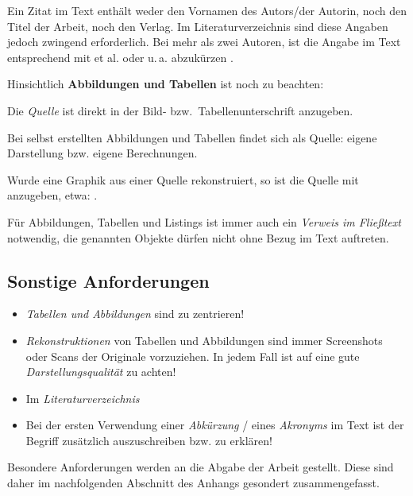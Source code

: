 \begin{compactitem}[\quad$\star$]
\begin{compactitem}[\quad\checkmark]
  \item Ein Zitat im Text enthält weder den Vornamen des Autors/der Autorin, noch den Titel der Arbeit, noch den Verlag.
    Im Literaturverzeichnis sind diese Angaben jedoch zwingend erforderlich. Bei mehr als zwei Autoren, ist die Angabe 
    im Text entsprechend mit \glqq et al.\grqq{} oder \glqq u.\,a.\grqq{} abzukürzen \parencite[vgl~][]{Chapman1999}.
  \end{compactitem}
\item Hinsichtlich \textbf{Abbildungen und Tabellen} ist noch zu beachten:
  \begin{compactitem}[\quad\checkmark]
  \item Die \emph{Quelle} ist direkt in der Bild- bzw.~Tabellenunterschrift anzugeben.
    \begin{compactitem}[\quad--]
    \item Bei selbst erstellten Abbildungen und Tabellen findet sich als Quelle: \glqq eigene Darstellung\grqq{} bzw. 
      \glqq eigene Berechnungen\grqq.
    \item Wurde eine Graphik aus einer Quelle rekonstruiert, so ist die Quelle mit anzugeben, etwa: 
      \glqq\parencite[eigene Darstellung nach][]{Mayring1994}\grqq.
    \end{compactitem}
  \item Für Abbildungen, Tabellen und Listings ist immer auch ein \emph{Verweis im Fließtext} notwendig, \dh die
    genannten Objekte dürfen nicht ohne Bezug im Text auftreten.
  \end{compactitem}
\end{compactitem}
%
\subsection{Sonstige Anforderungen}
\label{subsec:Anh-Anforderungen-Sonstige}
%
\begin{itemize}[\quad$\star$]
\item \emph{Tabellen und Abbildungen} sind zu zentrieren!
\item \emph{Rekonstruktionen} von Tabellen und Abbildungen sind immer Screenshots oder Scans der Originale
  vorzuziehen. In jedem Fall ist auf eine gute \emph{Darstellungsqualität} zu achten!
\item Im \emph{Literaturverzeichnis}
\item Bei der ersten Verwendung einer \emph{Abkürzung} / eines \emph{Akronyms} im Text ist der Begriff
  zusätzlich auszuschreiben bzw. zu erklären!
\end{itemize}

Besondere Anforderungen werden an die Abgabe der Arbeit gestellt. Diese sind daher im nachfolgenden Abschnitt des Anhangs gesondert zusammengefasst.